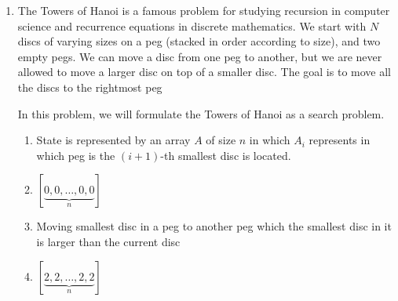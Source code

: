 \documentclass[12pt,a4paper,pdftex]{report}
\theoremstyle{definition}
\begin{document}
\begin{enumerate}

	\item The Towers of Hanoi is a famous problem for studying recursion in computer
	science and recurrence equations in discrete mathematics. We start with \(N\)
	discs of varying sizes on a peg (stacked in order according to size), and two
	empty pegs. We can move a disc from one peg to another, but we are never allowed
	to move a larger disc on top of a smaller disc. The goal is to move all the
	discs to the rightmost peg

    In this problem, we will formulate the Towers of Hanoi as a search problem.  


	\begin{solution}
            \begin{enumerate}
                \item State is represented by an array $A$ of size $n$ in which $A_i$ represents 
                    in which peg is the $(i+1)$-th smallest disc is located.
                \item $[\underbrace{0, 0, \dots, 0, 0}_n]$
                \item Moving smallest disc in a peg to another peg which the smallest disc in it is larger than the current disc
                \item $[\underbrace{2, 2, \dots, 2, 2}_n]$
            \end{enumerate}
	\end{solution}
\end{enumerate}
\end{document}
